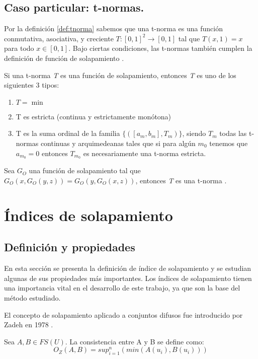 \subsection{Caso particular: t-normas.}
Por la definición \ref{def:tnorma} sabemos que una t-norma es una función conmutativa, asociativa, y creciente $T:[0,1]^2 \rightarrow [0,1]$ tal que $T(x,1) = x$ para todo $x \in [0,1]$. Bajo ciertas condiciones, las t-normas también cumplen la definición de función de solapamiento \cite{bustince2009overlap}. 
\begin{theorem}
Si una t-norma \emph{T} es una función de solapamiento, entonces \emph{T} es uno de los siguientes 3 tipos:
\begin{enumerate}[label=(\arabic*),ref=(\arabic*)]
	\item $T = \min$
	\item T es estricta (continua y estrictamente monótona)
	\item T es la suma ordinal de la familia $\{([a_{m},b_{m}],T_{m})\}$, siendo $T_{m}$ todas las t-normas continuas y arquimedeanas tales que si para algún $m_{0}$ tenemos que $a_{m_{0}} = 0$ entonces $T_{m_{0}}$ es necesariamente una t-norma estricta.
\end{enumerate}
\end{theorem}
\begin{proposition}
Sea $G_{O}$ una función de solapamiento tal que $G_{O}(x,G_{O}(y,z)) = G_{O}(y,G_{O}(x,z))$, entonces \emph{T} es una t-norma \cite{bustince2013overlap}.
\end{proposition}
\section{Índices de solapamiento}\label{sec:overlap-indexes}
\subsection{Definición y propiedades}
En esta sección se presenta la definición de índice de solapamiento y se estudian algunas de sus propiedades más importantes. Los índices de solapamiento tienen una importancia vital en el desarrollo de este trabajo, ya que son la base del método estudiado. 

El concepto de solapamiento aplicado a conjuntos difusos fue introducido por Zadeh en 1978 \cite{zadeh1978}.

\begin{definition}
Sea $A,B \in FS(U)$. La consistencia entre A y B se define como:
\begin{equation}\label{eq:zadeh-consistency}
O_{Z}(A,B) = sup_{i=1}^{n}(min(A(u_{i}),B(u_{i})))
\end{equation}
\end{definition}

